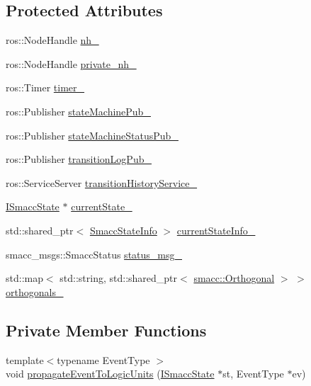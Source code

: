 \subsection*{Protected Attributes}
\begin{DoxyCompactItemize}
\item 
ros\+::\+Node\+Handle \hyperlink{classsmacc_1_1ISmaccStateMachine_ad8877bcca9dbb345fe72cca839c93dd3}{nh\+\_\+}
\item 
ros\+::\+Node\+Handle \hyperlink{classsmacc_1_1ISmaccStateMachine_a9c6a5c647ecca6599589c12fdcd53bfc}{private\+\_\+nh\+\_\+}
\item 
ros\+::\+Timer \hyperlink{classsmacc_1_1ISmaccStateMachine_ab6b00dc92aa86f1074d795fb4057e5bc}{timer\+\_\+}
\item 
ros\+::\+Publisher \hyperlink{classsmacc_1_1ISmaccStateMachine_af4aa9fed70bd4c57b19e3370fbd25de7}{state\+Machine\+Pub\+\_\+}
\item 
ros\+::\+Publisher \hyperlink{classsmacc_1_1ISmaccStateMachine_a55a7c7b26ad4dfea441c62c6326a5414}{state\+Machine\+Status\+Pub\+\_\+}
\item 
ros\+::\+Publisher \hyperlink{classsmacc_1_1ISmaccStateMachine_acc42eb050325c1edc77d81675fb1286a}{transition\+Log\+Pub\+\_\+}
\item 
ros\+::\+Service\+Server \hyperlink{classsmacc_1_1ISmaccStateMachine_a73e2a7ca89c3d807eafe5cfb1e86ea05}{transition\+History\+Service\+\_\+}
\item 
\hyperlink{classsmacc_1_1ISmaccState}{I\+Smacc\+State} $\ast$ \hyperlink{classsmacc_1_1ISmaccStateMachine_a9c6e7745205bcce80a301f2fbe8f7e99}{current\+State\+\_\+}
\item 
std\+::shared\+\_\+ptr$<$ \hyperlink{classsmacc_1_1introspection_1_1SmaccStateInfo}{Smacc\+State\+Info} $>$ \hyperlink{classsmacc_1_1ISmaccStateMachine_a95e42f735cecdc231ad5372bf9fe7eaf}{current\+State\+Info\+\_\+}
\item 
smacc\+\_\+msgs\+::\+Smacc\+Status \hyperlink{classsmacc_1_1ISmaccStateMachine_a4f47dd614f12a95e7a3c46d465ce4b13}{status\+\_\+msg\+\_\+}
\item 
std\+::map$<$ std\+::string, std\+::shared\+\_\+ptr$<$ \hyperlink{classsmacc_1_1Orthogonal}{smacc\+::\+Orthogonal} $>$ $>$ \hyperlink{classsmacc_1_1ISmaccStateMachine_ae8e5c25d0aecd91fe496df13751bc667}{orthogonals\+\_\+}
\end{DoxyCompactItemize}
\subsection*{Private Member Functions}
\begin{DoxyCompactItemize}
\item 
{\footnotesize template$<$typename Event\+Type $>$ }\\void \hyperlink{classsmacc_1_1ISmaccStateMachine_a268198b98e9540f4edb703801527a192}{propagate\+Event\+To\+Logic\+Units} (\hyperlink{classsmacc_1_1ISmaccState}{I\+Smacc\+State} $\ast$st, Event\+Type $\ast$ev)
\end{DoxyCompactItemize}
